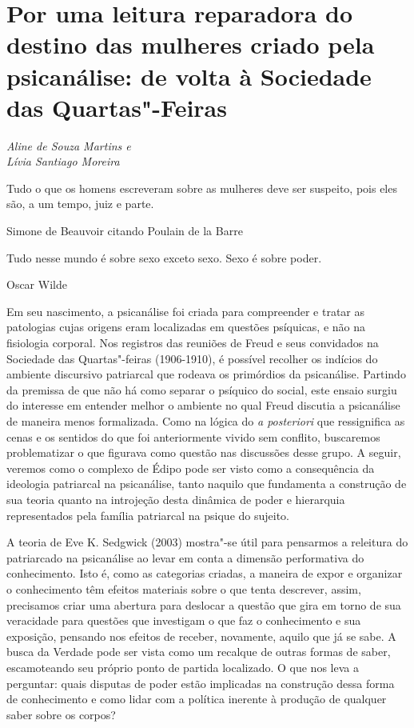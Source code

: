 \chapter*{Por uma leitura reparadora do destino das mulheres criado
pela psicanálise: de volta à Sociedade das Quartas"-Feiras}

\begin{flushright}
\emph{Aline de Souza Martins e\\ Lívia Santiago Moreira}
\end{flushright}

\epigraph{Tudo o que os homens escreveram sobre as mulheres deve ser suspeito,
pois eles são, a um tempo, juiz e parte.}{Simone de Beauvoir citando Poulain de la Barre}

\epigraph{Tudo nesse mundo é sobre sexo exceto sexo. Sexo é sobre poder.}{Oscar Wilde}

Em seu nascimento, a psicanálise foi criada para compreender e tratar as
patologias cujas origens eram localizadas em questões psíquicas, e não
na fisiologia corporal. Nos registros das reuniões de Freud e seus
convidados na Sociedade das Quartas"-feiras (1906-1910), é possível
recolher os indícios do ambiente discursivo patriarcal que rodeava os
primórdios da psicanálise. Partindo da premissa de que não há como
separar o psíquico do social, este ensaio surgiu do interesse em
entender melhor o ambiente no qual Freud discutia a psicanálise de
maneira menos formalizada. Como na lógica do \emph{a posteriori} que
ressignifica as cenas e os sentidos do que foi anteriormente vivido sem
conflito, buscaremos problematizar o que figurava como questão nas
discussões desse grupo. A seguir, veremos como o complexo de Édipo pode
ser visto como a consequência da ideologia patriarcal na psicanálise,
tanto naquilo que fundamenta a construção de sua teoria quanto na
introjeção desta dinâmica de poder e hierarquia representados pela
família patriarcal na psique do sujeito.

A teoria de Eve K. Sedgwick (2003) mostra"-se útil para pensarmos a
releitura do patriarcado na psicanálise ao levar em conta a dimensão
performativa do conhecimento. Isto é, como as categorias criadas, a
maneira de expor e organizar o conhecimento têm efeitos materiais sobre
o que tenta descrever, assim, precisamos criar uma abertura para
deslocar a questão que gira em torno de sua veracidade para questões que
investigam o que faz o conhecimento e sua exposição, pensando nos
efeitos de receber, novamente, aquilo que já se sabe. A busca da Verdade
pode ser vista como um recalque de outras formas de saber, escamoteando
seu próprio ponto de partida localizado. O que nos leva a perguntar:
quais disputas de poder estão implicadas na construção dessa forma de
conhecimento e como lidar com a política inerente à produção de qualquer
saber sobre os corpos?

